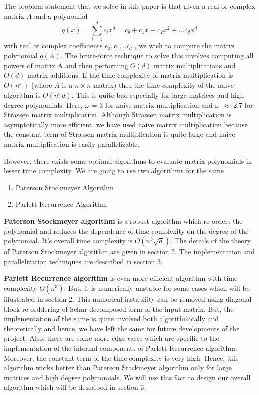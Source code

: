 \documentclass[12pt,a4paper]{article}
\begin{document}
The problem statement that we solve in this paper is that given a real or complex matrix $A$ and a polynomial $$q(x) = \sum_{i=1}^{d} c_{i}x^{d} = c_{0} + c_{1}x + c_{2}x^{2} + ... c_{d}x^{d}$$ with real or complex coefficients $c_{0},c_{1},..c_{d}$ , we wish to compute the matrix polynomial $q(A)$. The brute-force technique to solve this involves computing all powers of matrix A and then performing $O(d)$ matrix multiplications and $O(d)$ matrix additions. If the time complexity of matrix multiplication is $O(n^{\omega})$ (where $A$ is a $n \times n$ matrix) then the time complexity of the naive algorithm is $O(n^{\omega}d)$. This is quite bad especially for large matrices and high degree polynomials. Here, $\omega$ = 3 for naive matrix multiplication and $\omega$ $\approx$ 2.7 for Strassen matrix multiplication. Although Strassen matrix multiplication is asymptotically more efficient, we have used naive matrix multiplication because the constant term of Strassen matrix multiplication is quite large and naive matrix multiplication is easily parallelizable.  

However, there exists some optimal algorithms to evaluate matrix polynomials in lesser time complexity. We are going to use two algorithms for the same
\begin{enumerate}
    \item Paterson Stockmeyer Algorithm
    \item Parlett Recurrence Algorithm
\end{enumerate}

\textbf{Paterson Stockmeyer algorithm} is a robust algorithm which re-orders the polynomial and reduces the dependence of time complexity on the degree of the polynomial. It's overall time complexity is $O(n^{3}\sqrt{d})$. The details of the theory of Paterson Stockmeyer algorithm are given in section 2. The implementation and parallelization techniques are described in section 3.

\textbf{Parlett Recurrence algorithm} is even more efficient algorithm with time complexity $O(n^{3})$. But, it is numerically unstable for some cases which will be illustrated in section 2. This numerical instability can be removed using diagonal block re-orddering of Schur decomposed form of the input matrix. But, the implementation of the same is quite involved both algorithmically and theoretically and hence, we have left the same for future developments of the project. Also, there are some more edge cases which are specific to the implementation of the internal components of Parlett Recurrence algorithm. Moreover, the constant term of the time complexity is very high. Hence, this algorithm works better than Paterson Stockmeyer algorithm only for large matrices and high degree polynomials. We will use this fact to design our overall algorithm which will be described in section 3.
\end{document}
